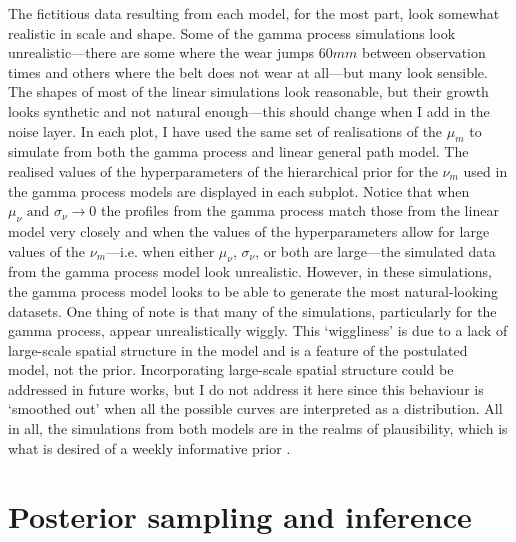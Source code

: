 The fictitious data resulting from each model, for the most part, look somewhat realistic in scale and shape. Some of the gamma process simulations look unrealistic---there are some where the wear jumps $60mm$ between observation times and others where the belt does not wear at all---but many look sensible. The shapes of most of the linear simulations look reasonable, but their growth looks synthetic and not natural enough---this should change when I add in the noise layer. In each plot, I have used the same set of realisations of the $\mu_m$ to simulate from both the gamma process and linear general path model. The realised values of the hyperparameters of the hierarchical prior for the $\nu_m$ used in the gamma process models are displayed in each subplot. Notice that when $\mu_\nu \text{ and } \sigma_\nu \longrightarrow 0$ the profiles from the gamma process match those from the linear model very closely and when the values of the hyperparameters allow for large values of the $\nu_m$---i.e. when either $\mu_\nu$, $\sigma_\nu$, or both are large---the simulated data from the gamma process model look unrealistic. However, in these simulations, the gamma process model looks to be able to generate the most natural-looking datasets. One thing of note is that many of the simulations, particularly for the gamma process, appear unrealistically wiggly. This `wiggliness' is due to a lack of large-scale spatial structure in the model and is a feature of the postulated model, not the prior. Incorporating large-scale spatial structure could be addressed in future works, but I do not address it here since this behaviour is `smoothed out' when all the possible curves are interpreted as a distribution. All in all, the simulations from both models are in the realms of plausibility, which is what is desired of a weekly informative prior \citep{gabry_vis_2019}.

\section{Posterior sampling and inference} \label{sec:belt-wear-fitting}

